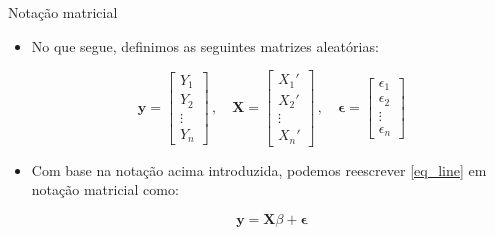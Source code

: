 \documentclass[11pt]{beamer}
\begin{document}
\begin{frame}{Notação matricial}
	\begin{itemize}

	\item No que segue, definimos as seguintes matrizes aleatórias:
	
	$$\boldsymbol{y} = \begin{bmatrix}
		Y_1 \\
		Y_2 \\
		\vdots \\
		Y_n
	\end{bmatrix}\, , \quad \boldsymbol{X} = \begin{bmatrix}
	X_1' \\
	X_2' \\
	\vdots \\
	X_n'
	\end{bmatrix}\,, \quad \boldsymbol{\epsilon} = \begin{bmatrix}
	\epsilon_1 \\
	\epsilon_2 \\
	\vdots \\
	\epsilon_n
	\end{bmatrix}$$
	\item Com base na notação acima introduzida, podemos reescrever \eqref{eq_line} em notação matricial como:
	
	\begin{equation}
			\boldsymbol{y} = \boldsymbol{X}\beta + \boldsymbol{\epsilon}
	\end{equation}

\end{itemize}
\end{frame}
\end{document}
